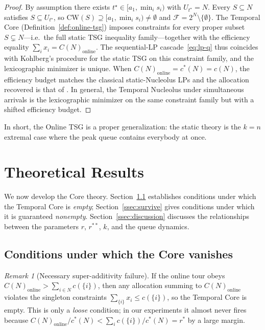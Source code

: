 \documentclass[11pt]{article}
\theoremstyle{plain}
\theoremstyle{definition}
\theoremstyle{remark}
\newtheorem{remark}[theorem]{Remark}
\newcommand{\F}{\mathcal{F}}
\newcommand{\CW}{\mathrm{CW}}
\newcommand{\cstar}{c^{\ast}}
\begin{document}
\begin{proof}
By assumption there exists $t^{\star}\in[a_1,\min_i s_i)$ with $U_{t^{\star}} = N$. Every $S\subseteq N$ satisfies $S\subseteq U_{t^{\star}}$, so $\CW(S)\supseteq [a_1,\min_i s_i)\neq\emptyset$ and $\F = 2^N\setminus\{\emptyset\}$. The Temporal Core (Definition~\ref{def:online-tsg}) imposes constraints for every proper subset $S\subsetneq N$---i.e.\ the full static TSG inequality family---together with the efficiency equality $\sum_i x_i = C(N)_{\text{online}}$. The sequential-LP cascade~\eqref{eq:lp-q} thus coincides with Kohlberg's procedure for the static TSG on this constraint family, and the lexicographic minimizer is unique. When $C(N)_{\text{online}}=\cstar(N)=c(N)$, the efficiency budget matches the classical static-Nucleolus LPs and the allocation recovered is that of \citet{potters1992tsg}. In general, the Temporal Nucleolus under simultaneous arrivals is the lexicographic minimizer on the same constraint family but with a shifted efficiency budget.
\end{proof}

In short, the Online TSG is a proper generalization: the static theory is the $k=n$ extremal case where the peak queue contains everybody at once.

\section{Theoretical Results}
\label{sec:theory}

We now develop the Core theory. Section~\ref{ssec:empty} establishes conditions under which the Temporal Core is \emph{empty}; Section~\ref{ssec:survive} gives conditions under which it is guaranteed \emph{nonempty}. Section~\ref{ssec:discussion} discusses the relationships between the parameters $r$, $r^{\ast\ast}$, $k$, and the queue dynamics.

\subsection{Conditions under which the Core vanishes}
\label{ssec:empty}

\begin{remark}[Necessary super-additivity failure]
\label{rem:remark1}
If the online tour obeys $C(N)_{\text{online}} > \sum_{i\in N} c(\{i\})$, then any allocation summing to $C(N)_{\text{online}}$ violates the singleton constraints $\sum_{\{i\}} x_i \le c(\{i\})$, so the Temporal Core is empty. This is only a \emph{loose} condition; in our experiments it almost never fires because $C(N)_{\text{online}}/\cstar(N) < \sum_i c(\{i\})/\cstar(N) = r^{\ast}$ by a large margin.
\end{remark}
\end{document}
